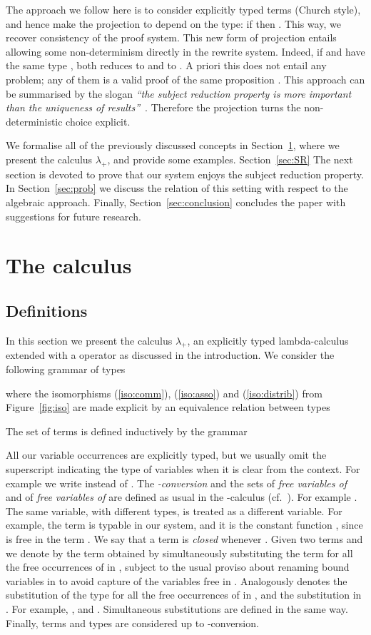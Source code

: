 \documentclass[final,copyright,creativecommons]{eptcs}
\newcommand{\OurCalculus}{\ensuremath{\lambda_+}}
\theoremstyle{definition}
\begin{document}
The approach we follow here is to consider explicitly typed terms (Church style), and hence make the projection to depend on the type:
if  then .
This way, we recover consistency of the proof system. This new form of projection entails allowing some non-determinism directly in the rewrite system. Indeed, if  and  have the same type ,
 both reduces to  and to .
A priori this does not entail any problem; any of them is a valid proof of the same proposition . This approach can be summarised by the slogan {\em ``the subject reduction property is more important than the uniqueness of results''}~\cite{DowekJiangIC11}. Therefore the projection turns the non-deterministic choice explicit.

We formalise all of the previously discussed concepts in Section~\ref{sec:calculus}, where we present the calculus \OurCalculus, and provide some examples. Section~\ref{sec:SR} The next section is devoted to prove that our system enjoys the subject reduction property. In Section~\ref{sec:prob} we discuss the relation of this setting with respect to the algebraic approach. Finally, Section~\ref{sec:conclusion} concludes the paper with suggestions for future research.

\section{The calculus}\label{sec:calculus}
\subsection{Definitions}
In this section we present the calculus \OurCalculus, an explicitly typed lambda-calculus extended with a  operator as discussed in the introduction.
We consider the following grammar of types

where the isomorphisms (\ref{iso:comm}), (\ref{iso:asso}) and (\ref{iso:distrib}) from Figure~\ref{fig:iso} are made explicit by an equivalence relation between types


The set of terms  is defined inductively by the grammar


All our variable occurrences are explicitly typed, but we usually omit the superscript indicating the type of variables when it is clear from the context. For example we write  instead of .
The {\em -conversion} and the sets  of {\em free variables of } and  of {\em free variables of } are defined as usual in the -calculus (cf.~\cite[\S2.1]{Barendregt84}). For example .
The same variable, with different types, is treated as a different variable. For example, the term  is typable in our system, and it is the constant function , since  is free in the term .
We say that a term  is {\em closed} whenever . Given two terms  and  we denote by  the term obtained by simultaneously substituting the term  for all the free occurrences of  in , subject to the usual proviso about renaming bound variables in  to avoid capture of the variables free in . Analogously  denotes the substitution of the type  for all the free occurrences of  in , and  the substitution in . For example, ,  and . Simultaneous substitutions are defined in the same way. Finally, terms and types are considered up to -conversion.
\end{document}
